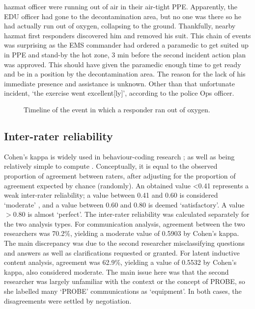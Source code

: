 \documentclass[link]{IWCOMP}
\begin{document}
hazmat officer were running out of air in their air-tight PPE. Apparently,
the EDU officer had gone to the decontamination area, but no one was there
so he had actually run out of oxygen, collapsing to the ground. Thankfully,
nearby hazmat first responders discovered him and removed his suit. This
chain of events was surprising as the EMS commander had ordered a paramedic
to get suited up in PPE and stand-by the hot zone, 3 min before the second
incident action plan was approved. This should have given the paramedic
enough time to get ready and be in a position by the decontamination area.
The reason for the lack of his immediate presence and assistance is unknown.
Other than that unfortunate incident, `the exercise went excellent[ly]',
according to the police Ops officer.

\begin{figure}[hbt!]
\centerline{}
\caption{Timeline of the event in which a responder ran out of
oxygen.\label{fig4}}\vspace*{-3pt}
\end{figure}

\subsection{Inter-rater reliability}\label{subsec4.4}

Cohen's kappa \citep{bib5} is widely used in behaviour-coding research
\citep{bib2}; \citep{bib4} as well as being relatively simple to
compute \citep{bib23}. Conceptually, it is equal to the observed
proportion of agreement between raters, after adjusting for the proportion
of agreement expected by chance (randomly). An obtained value <0.41
represents a weak inter-rater reliability; a value between 0.41 and 0.60 is
considered `moderate' \citep{bib4}, and a value between 0.60 and
0.80 is deemed `satisfactory'. A value $>$0.80 is almost
`perfect'. The inter-rater reliability was calculated separately for the two
analysis types. For communication analysis, agreement between the two
researchers was 70.2{\%}, yielding a moderate value of 0.5903 by Cohen's
kappa. The main discrepancy was due to the second researcher misclassifying
questions and answers as well as clarifications requested or granted. For
latent inductive content analysis, agreement was 62.9{\%}, yielding a value
of 0.5532 by Cohen's kappa, also considered moderate. The main issue here
was that the second researcher was largely unfamiliar with the context or
the concept of PROBE, so she labelled many `PROBE' communications as
`equipment'. In both cases, the disagreements were settled by negotiation.
\end{document}
